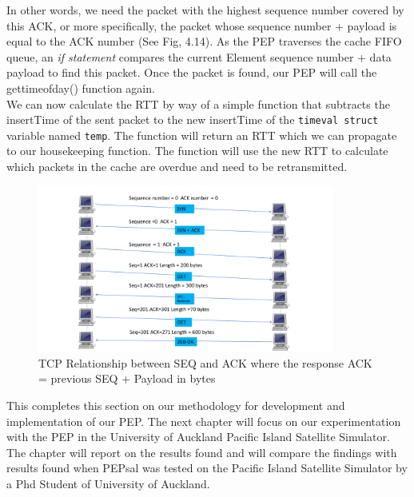 In other words, we need the packet with the highest sequence number covered by this ACK, or more specifically, the packet whose sequence number + payload is equal to the ACK number (See Fig, 4.14). As the PEP traverses the cache FIFO queue, an \emph{if statement} compares the current Element sequence number + data payload to find this packet. Once the packet is found, our PEP will call the gettimeofday() function again. \\

We can now calculate the RTT by way of a simple function that subtracts the insertTime of the sent packet to the new insertTime of the {\tt timeval struct} variable named {\tt temp}. The function will return an RTT which we can propagate to our housekeeping function. The function will use the new RTT to calculate which packets in the cache are overdue and need to be retransmitted.  \\

\begin{figure}[h!]
    \centering
    \includegraphics[width=0.87\textwidth]{ACK.pdf}
    \caption{TCP Relationship between SEQ and ACK where the response ACK = previous SEQ + Payload in bytes}
    \label{fig: TCP SEQ + ACK} 
\end{figure}

This completes this section on our methodology for development and implementation of our PEP. The next chapter will focus on our experimentation with the PEP in the University of Auckland Pacific Island Satellite Simulator. The chapter will report on the results found and will compare the findings with results found when PEPsal was tested on the Pacific Island Satellite Simulator by a Phd Student of University of Auckland. 
